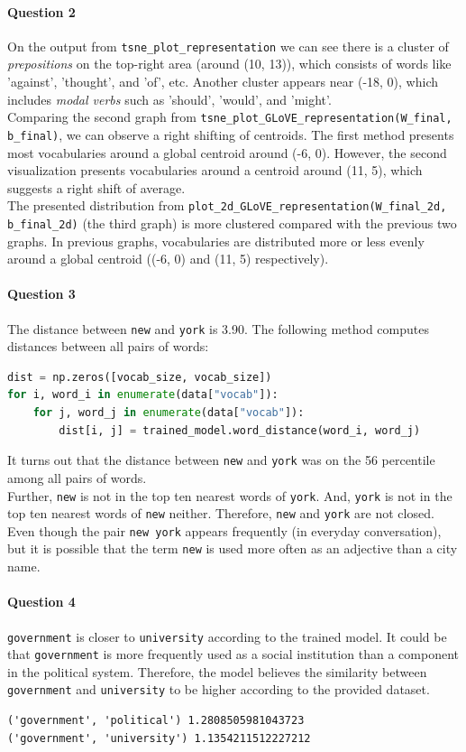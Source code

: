 \documentclass{article}
\begin{document}
    \paragraph{Question 2} On the output from \texttt{tsne\_plot\_representation} we can see there is a cluster of \emph{prepositions} on the top-right area (around (10, 13)), which consists of words like 'against', 'thought', and 'of', etc. Another cluster appears near (-18, 0), which includes \emph{modal verbs} such as 'should', 'would', and 'might'. \\
    Comparing the second graph from \texttt{tsne\_plot\_GLoVE\_representation(W\_final, b\_final)}, we can observe a right shifting of centroids. The first method presents most vocabularies around a global centroid around (-6, 0). However, the second visualization presents vocabularies around a centroid around (11, 5), which suggests a right shift of average. \\
    The presented distribution from \texttt{plot\_2d\_GLoVE\_representation(W\_final\_2d, b\_final\_2d)} (the third graph) is more clustered compared with the previous two graphs. In previous graphs, vocabularies are distributed more or less evenly around a global centroid ((-6, 0) and (11, 5) respectively).
    \paragraph{Question 3} The distance between \texttt{new} and \texttt{york} is 3.90. The following method computes distances between all pairs of words:
    \begin{lstlisting}[language=Python]
dist = np.zeros([vocab_size, vocab_size])
for i, word_i in enumerate(data["vocab"]):
    for j, word_j in enumerate(data["vocab"]):
        dist[i, j] = trained_model.word_distance(word_i, word_j)
    \end{lstlisting}
    It turns out that the distance between \texttt{new} and \texttt{york} was on the 56 percentile among all pairs of words. \\
    Further, \texttt{new} is not in the top ten nearest words of \texttt{york}. And, \texttt{york} is not in the top ten nearest words of \texttt{new} neither. Therefore, \texttt{new} and \texttt{york} are not closed. \\
    Even though the pair \texttt{new york} appears frequently (in everyday conversation), but it is possible that the term \texttt{new} is used more often as an adjective than a city name.
    \paragraph{Question 4} \texttt{government} is closer to \texttt{university} according to the trained model. 
    It could be that \texttt{government} is more frequently used as a social institution than a component in the political system. Therefore, the model believes the similarity between \texttt{government} and \texttt{university} to be higher according to the provided dataset.
    \begin{lstlisting}
('government', 'political') 1.2808505981043723
('government', 'university') 1.1354211512227212
    \end{lstlisting}
\end{document}
